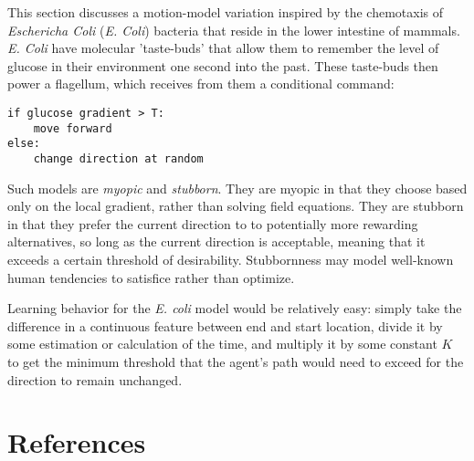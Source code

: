 \documentclass[]{article}
\begin{document}
This section discusses a motion-model variation inspired by the chemotaxis of \emph{Eschericha Coli} (\emph{E. Coli}) bacteria that reside in the lower intestine of mammals. \emph{E. Coli} have molecular 'taste-buds' that allow them to remember the level of glucose in their environment one second into the past. These taste-buds then power a flagellum, which receives from them a conditional command:
\begin{verbatim}
if glucose gradient > T:
    move forward
else:
    change direction at random
\end{verbatim}
Such models are \emph{myopic} and \emph{stubborn}.  They are myopic in that they choose based only on the local gradient, rather than solving field equations. They are stubborn in that they prefer the current direction to to potentially more rewarding alternatives, so long as the current direction is acceptable, meaning that it exceeds a certain threshold of desirability. Stubbornness may model well-known human tendencies to satisfice rather than optimize.  

Learning behavior for the \emph{E. coli} model would be relatively easy: simply take the difference in a continuous feature between end and start location, divide it by some estimation or calculation of the time, and multiply it by some constant $K$ to get the minimum threshold that the agent's path would need to exceed for the direction to remain unchanged.

\section{References}



\end{document}
